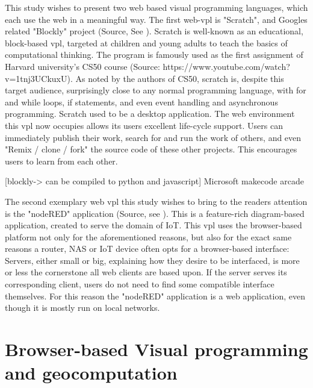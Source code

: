 This study wishes to present two web based visual programming languages, which each use the web in a meaningful way.  
The first web-vpl is "Scratch", and Googles related "Blockly" project (Source, See ). 
Scratch is well-known as an educational, block-based vpl, targeted at children and young adults to teach the basics of computational thinking. 
The program is famously used as the first assignment of Harvard university's CS50 course (Source: https://www.youtube.com/watch?v=1tnj3UCkuxU).   
As noted by the authors of CS50, scratch is, despite this target audience, surprisingly close to any normal programming language, with for and while loops, if statements, and even event handling and asynchronous programming. 
Scratch used to be a desktop application. 
The web environment this vpl now occupies allows its users excellent life-cycle support. 
Users can immediately publish their work, search for and run the work of others, and even "Remix / clone / fork" the source code of these other projects. 
This encourages users to learn from each other.

[blockly-> can be compiled to python and javascript]
Microsoft makecode arcade


The second exemplary web vpl this study wishes to bring to the readers attention is the "nodeRED" application (Source, see ). 
This is a feature-rich diagram-based application, created to serve the domain of IoT.
This vpl uses the browser-based platform not only for the aforementioned  reasons, but also for the exact same reasons a router, NAS or IoT device often opts for a browser-based interface: 
Servers, either small or big, explaining how they desire to be interfaced, is more or less the cornerstone all web clients are based upon.  
If the server serves its corresponding client, users do not need to find some compatible interface themselves.
For this reason the "nodeRED" application is a web application, even though it is mostly run on local networks.   

\section{Browser-based Visual programming and geocomputation} 

